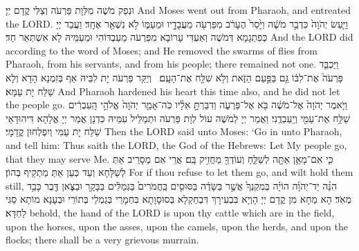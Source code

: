 {{}
{וּנְפַק מֹשֶׁה מִלְּוָת פַּרְעֹה וְצַלִּי קֳדָם יְיָ׃}
{And Moses went out from Pharaoh, and entreated the LORD.}{}
{וַיַּ֤עַשׂ יְהֹוָה֙ כִּדְבַ֣ר מֹשֶׁ֔ה וַיָּ֙סַר֙ הֶעָרֹ֔ב מִפַּרְעֹ֖ה מֵעֲבָדָ֣יו וּמֵעַמּ֑וֹ לֹ֥א נִשְׁאַ֖ר אֶחָֽד׃
}
{וַעֲבַד יְיָ כְּפִתְגָמָא דְּמֹשֶׁה וְאַעְדִּי עָרוֹבָא מִפַּרְעֹה מֵעַבְדּוֹהִי וּמֵעַמֵּיהּ לָא אִשְׁתְּאַר חַד׃}
{And the LORD did according to the word of Moses; and He removed the swarms of flies from Pharaoh, from his servants, and from his people; there remained not one.}{}
{וַיַּכְבֵּ֤ד פַּרְעֹה֙ אֶת־לִבּ֔וֹ גַּ֖ם בַּפַּ֣עַם הַזֹּ֑את וְלֹ֥א שִׁלַּ֖ח אֶת־הָעָֽם׃ \petucha 
{}}
{וְיַקַּר פַּרְעֹה יָת לִבֵּיהּ אַף בְּזִמְנָא הָדָא וְלָא שַׁלַּח יָת עַמָּא׃}
{And Pharaoh hardened his heart this time also, and he did not let the people go.}{}
\newperek
{}%
{וַיֹּ֤אמֶר יְהֹוָה֙ אֶל־מֹשֶׁ֔ה בֹּ֖א אֶל־פַּרְעֹ֑ה וְדִבַּרְתָּ֣ אֵלָ֗יו כֹּֽה־אָמַ֤ר יְהֹוָה֙ אֱלֹהֵ֣י הָֽעִבְרִ֔ים שַׁלַּ֥ח אֶת־עַמִּ֖י וְיַֽעַבְדֻֽנִי׃}
{וַאֲמַר יְיָ לְמֹשֶׁה עוֹל לְוָת פַּרְעֹה וּתְמַלֵּיל עִמֵּיהּ כִּדְנָן אֲמַר יְיָ אֱלָהָא דִּיהוּדָאֵי שַׁלַּח יָת עַמִּי וְיִפְלְחוּן קֳדָמָי׃}
{Then the LORD said unto Moses: ‘Go in unto Pharaoh, and tell him: Thus saith the LORD, the God of the Hebrews: Let My people go, that they may serve Me.}{}
{כִּ֛י אִם־מָאֵ֥ן אַתָּ֖ה לְשַׁלֵּ֑חַ וְעוֹדְךָ֖ מַחֲזִ֥יק בָּֽם׃
}
{אֲרֵי אִם מְסָרֵיב אַתְּ לְשַׁלָּחָא וְעַד כְּעַן אַתְּ מַתְקֵיף בְּהוֹן׃}
{For if thou refuse to let them go, and wilt hold them still,}{}
{הִנֵּ֨ה יַד־יְהֹוָ֜ה הוֹיָ֗ה בְּמִקְנְךָ֙ אֲשֶׁ֣ר בַּשָּׂדֶ֔ה בַּסּוּסִ֤ים בַּֽחֲמֹרִים֙ בַּגְּמַלִּ֔ים בַּבָּקָ֖ר וּבַצֹּ֑אן דֶּ֖בֶר כָּבֵ֥ד מְאֹֽד׃
}
{הָא מַחָא מִן קֳדָם יְיָ הָוְיָא בִּבְעִירָךְ דִּבְחַקְלָא בְּסוּסָוָתָא בִּחְמָרֵי בְּגַמְלֵי בְּתוֹרֵי וּבְעָנָא מוֹתָא סַגִּי לַחְדָּא׃}
{behold, the hand of the LORD is upon thy cattle which are in the field, upon the horses, upon the asses, upon the camels, upon the herds, and upon the flocks; there shall be a very grievous murrain.}{}
}
